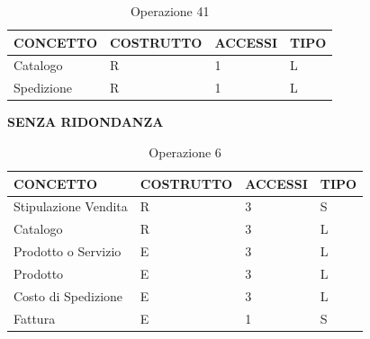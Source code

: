 \begin{table}[H]
\centering
\caption{Operazione 41}
\begin{tabular}{llll}
\\ \hline
\multicolumn{1}{|l|}{\textbf{CONCETTO}} & \multicolumn{1}{l|}{\textbf{COSTRUTTO}} & \multicolumn{1}{l|}{\textbf{ACCESSI}} & \multicolumn{1}{l|}{\textbf{TIPO}} \\ \hline
\multicolumn{1}{|l|}{Catalogo}
& \multicolumn{1}{l|}{R}                  & \multicolumn{1}{l|}{1}                & \multicolumn{1}{l|}{L}             \\ \hline
\multicolumn{1}{|l|}{Spedizione}
& \multicolumn{1}{l|}{R}                  & \multicolumn{1}{l|}{1}                & \multicolumn{1}{l|}{L}             \\ \hline
\end{tabular}
\end{table}


\centerline{\textbf{SENZA RIDONDANZA}}

\begin{table}[H]
\centering
\caption{Operazione 6}
\begin{tabular}{llll}
\\ \hline
\multicolumn{1}{|l|}{\textbf{CONCETTO}} & \multicolumn{1}{l|}{\textbf{COSTRUTTO}} & \multicolumn{1}{l|}{\textbf{ACCESSI}} & \multicolumn{1}{l|}{\textbf{TIPO}} \\ \hline
\multicolumn{1}{|l|}{Stipulazione Vendita}
& \multicolumn{1}{l|}{R}                  & \multicolumn{1}{l|}{3}                & \multicolumn{1}{l|}{S}             \\ \hline
\multicolumn{1}{|l|}{Catalogo}             & \multicolumn{1}{l|}{R}                  & \multicolumn{1}{l|}{3}        
& \multicolumn{1}{l|}{L}             
			 \\ \hline
\multicolumn{1}{|l|}{Prodotto o Servizio}             & \multicolumn{1}{l|}{E}                  & \multicolumn{1}{l|}{3}        
& \multicolumn{1}{l|}{L}             
			 \\ \hline
\multicolumn{1}{|l|}{Prodotto}             & \multicolumn{1}{l|}{E}                  & \multicolumn{1}{l|}{3}        
& \multicolumn{1}{l|}{L}             
			 \\ \hline
\multicolumn{1}{|l|}{Costo di Spedizione}     & \multicolumn{1}{l|}{E}                  & \multicolumn{1}{l|}{3}      & \multicolumn{1}{l|}{L}             
			 \\ \hline
\multicolumn{1}{|l|}{Fattura}
& \multicolumn{1}{l|}{E}                  & \multicolumn{1}{l|}{1}                & \multicolumn{1}{l|}{S}             \\ \hline
\end{tabular}
\end{table}

